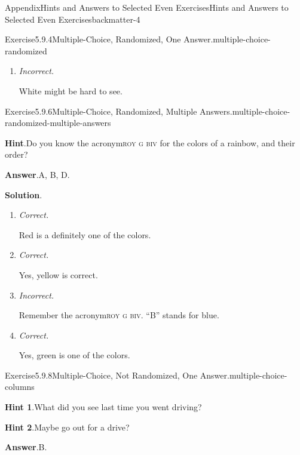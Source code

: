 \documentclass[oneside,10pt,]{book}
\newcommand{\blocktitlefont}{\relax}
\newcommand{\acronym}[1]{\textsc{\MakeLowercase{#1}}}
\newcommand{\lititle}[1]{{\slshape#1}}
\numberwithin{equation}{section}
\begin{document}
\begin{solutions-chapter}{Appendix}{Hints and Answers to Selected Even Exercises}{}{Hints and Answers to Selected Even Exercises}{}{}{backmatter-4}
\begin{divisionsolution}{Exercise}{5.9.4}{Multiple-Choice, Randomized, One Answer.}{multiple-choice-randomized}
\begin{enumerate}[label={\Alph*.}]
Red is universally used for prohibited activities or serious warnings.%
\item{}\lititle{Incorrect.}\par%
White might be hard to see.%
\end{enumerate}
%
\end{divisionsolution}%
\begin{divisionsolution}{Exercise}{5.9.6}{Multiple-Choice, Randomized, Multiple Answers.}{multiple-choice-randomized-multiple-answers}%
\par\smallskip%
\noindent\textbf{\blocktitlefont Hint}.\hypertarget{multiple-choice-randomized-multiple-answers-4-back}{}\quad{}Do you know the acronym\textellipsis{}\acronym{ROY G BIV} for the colors of a rainbow, and their order?%
\par\smallskip%
\noindent\textbf{\blocktitlefont Answer}.\hypertarget{multiple-choice-randomized-multiple-answers-5-back}{}\quad{}A, B, D.%
\par\smallskip%
\noindent\textbf{\blocktitlefont Solution}.\hypertarget{multiple-choice-randomized-multiple-answers-6-back}{}\quad{}%
\begin{enumerate}[label={\Alph*.}]
\item{}\lititle{Correct.}\par%
Red is a definitely one of the colors.%
\item{}\lititle{Correct.}\par%
Yes, yellow is correct.%
\item{}\lititle{Incorrect.}\par%
Remember the acronym\textellipsis{}\acronym{ROY G BIV}.  ``B'' stands for blue.%
\item{}\lititle{Correct.}\par%
Yes, green is one of the colors.%
\end{enumerate}
%
\end{divisionsolution}%
\begin{divisionsolution}{Exercise}{5.9.8}{Multiple-Choice, Not Randomized, One Answer.}{multiple-choice-columns}%
\par\smallskip%
\noindent\textbf{\blocktitlefont Hint 1}.\hypertarget{multiple-choice-columns-4-back}{}\quad{}What did you see last time you went driving?%
\par\smallskip%
\noindent\textbf{\blocktitlefont Hint 2}.\hypertarget{multiple-choice-columns-5-back}{}\quad{}Maybe go out for a drive?%
\par\smallskip%
\noindent\textbf{\blocktitlefont Answer}.\hypertarget{multiple-choice-columns-6-back}{}\quad{}B.%

\end{divisionsolution}
\end{solutions-chapter}
\end{document}

